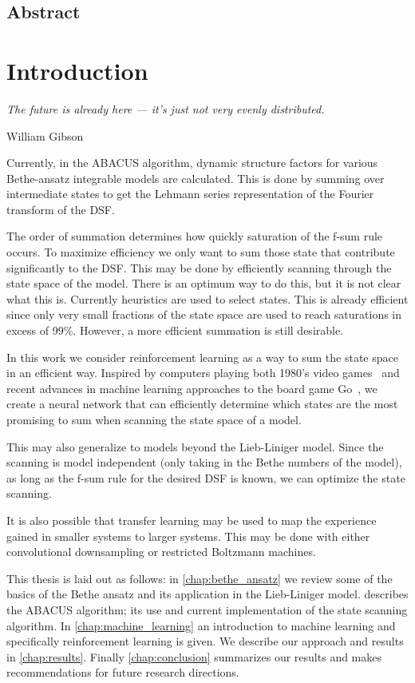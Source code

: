 \documentclass[11pt, a4paper]{report} %
\begin{document}
\newpage

\section*{Abstract}

\chapter{Introduction}

\epigraph{\textit{The future is already here --- it's just not very evenly distributed.}}{William Gibson}

Currently, in the ABACUS algorithm, dynamic structure factors for various Bethe-ansatz integrable models are calculated.
This is done by summing over intermediate states to get the Lehmann series representation of the Fourier transform of the DSF.

The order of summation determines how quickly saturation of the f-sum rule occurs.
To maximize efficiency we only want to sum those state that contribute significantly to the DSF.
This may be done by efficiently scanning through the state space of the model.
There is an optimum way to do this, but it is not clear what this is.
Currently heuristics are used to select states.
This is already efficient since only very small fractions of the state space are used to reach saturations in excess of 99\%.
However, a more efficient summation is still desirable.

In this work we consider reinforcement learning as a way to sum the state space in an efficient way.
Inspired by computers playing both 1980's video games~\cite{mnih13_playin_atari_with_deep_reinf_learn} and recent advances in machine learning approaches to the board game Go~\cite{Silver2017a,Silver2017}, we create a neural network that can efficiently determine which states are the most promising to sum when scanning the state space of a model.

This may also generalize to models beyond the Lieb-Liniger model.
Since the scanning is model independent (only taking in the Bethe numbers of the model), as long as the f-sum rule for the desired DSF is known, we can optimize the state scanning.

It is also possible that transfer learning may be used to map the experience gained in smaller systems to larger systems.
This may be done with either convolutional downsampling or restricted Boltzmann machines.

This thesis is laid out as follows:
in \cref{chap:bethe_ansatz} we review some of the basics of the Bethe ansatz and its application in the Lieb-Liniger model.
 describes the ABACUS algorithm; its use and current implementation of the state scanning algorithm.
In \cref{chap:machine_learning} an introduction to machine learning and specifically reinforcement learning is given.
We describe our approach and results in \cref{chap:results}.
Finally \cref{chap:conclusion} summarizes our results and makes recommendations for future research directions.
\end{document}
